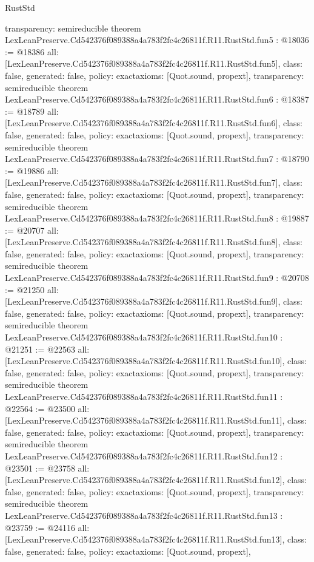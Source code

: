 \begin{lexlean}{RustStd}
\begin{coremodule}
{  transparency: semireducible
}
theorem LexLeanPreserve.Cd542376f089388a4a783f2fc4c26811f.R11.RustStd.fun5 : @18036 := @18386 {
  all: [LexLeanPreserve.Cd542376f089388a4a783f2fc4c26811f.R11.RustStd.fun5],
  class: false,
  generated: false,
  policy: exact{axioms: [Quot.sound, propext]},
  transparency: semireducible
}
theorem LexLeanPreserve.Cd542376f089388a4a783f2fc4c26811f.R11.RustStd.fun6 : @18387 := @18789 {
  all: [LexLeanPreserve.Cd542376f089388a4a783f2fc4c26811f.R11.RustStd.fun6],
  class: false,
  generated: false,
  policy: exact{axioms: [Quot.sound, propext]},
  transparency: semireducible
}
theorem LexLeanPreserve.Cd542376f089388a4a783f2fc4c26811f.R11.RustStd.fun7 : @18790 := @19886 {
  all: [LexLeanPreserve.Cd542376f089388a4a783f2fc4c26811f.R11.RustStd.fun7],
  class: false,
  generated: false,
  policy: exact{axioms: [Quot.sound, propext]},
  transparency: semireducible
}
theorem LexLeanPreserve.Cd542376f089388a4a783f2fc4c26811f.R11.RustStd.fun8 : @19887 := @20707 {
  all: [LexLeanPreserve.Cd542376f089388a4a783f2fc4c26811f.R11.RustStd.fun8],
  class: false,
  generated: false,
  policy: exact{axioms: [Quot.sound, propext]},
  transparency: semireducible
}
theorem LexLeanPreserve.Cd542376f089388a4a783f2fc4c26811f.R11.RustStd.fun9 : @20708 := @21250 {
  all: [LexLeanPreserve.Cd542376f089388a4a783f2fc4c26811f.R11.RustStd.fun9],
  class: false,
  generated: false,
  policy: exact{axioms: [Quot.sound, propext]},
  transparency: semireducible
}
theorem LexLeanPreserve.Cd542376f089388a4a783f2fc4c26811f.R11.RustStd.fun10 : @21251 := @22563 {
  all: [LexLeanPreserve.Cd542376f089388a4a783f2fc4c26811f.R11.RustStd.fun10],
  class: false,
  generated: false,
  policy: exact{axioms: [Quot.sound, propext]},
  transparency: semireducible
}
theorem LexLeanPreserve.Cd542376f089388a4a783f2fc4c26811f.R11.RustStd.fun11 : @22564 := @23500 {
  all: [LexLeanPreserve.Cd542376f089388a4a783f2fc4c26811f.R11.RustStd.fun11],
  class: false,
  generated: false,
  policy: exact{axioms: [Quot.sound, propext]},
  transparency: semireducible
}
theorem LexLeanPreserve.Cd542376f089388a4a783f2fc4c26811f.R11.RustStd.fun12 : @23501 := @23758 {
  all: [LexLeanPreserve.Cd542376f089388a4a783f2fc4c26811f.R11.RustStd.fun12],
  class: false,
  generated: false,
  policy: exact{axioms: [Quot.sound, propext]},
  transparency: semireducible
}
theorem LexLeanPreserve.Cd542376f089388a4a783f2fc4c26811f.R11.RustStd.fun13 : @23759 := @24116 {
  all: [LexLeanPreserve.Cd542376f089388a4a783f2fc4c26811f.R11.RustStd.fun13],
  class: false,
  generated: false,
  policy: exact{axioms: [Quot.sound, propext]},
}
\end{coremodule}
\end{lexlean}

